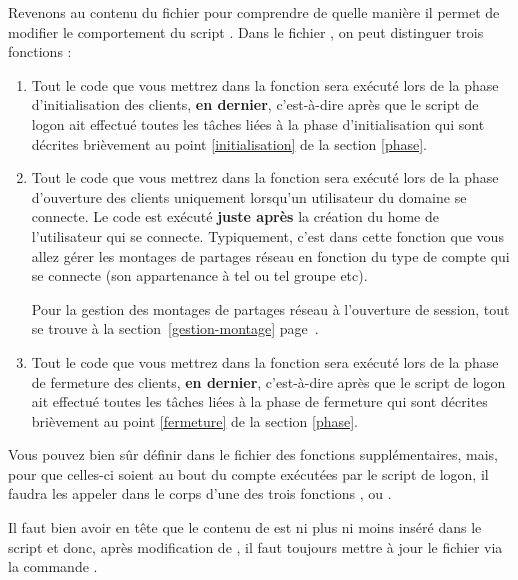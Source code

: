 Revenons au contenu du fichier  pour comprendre
de quelle manière il permet de modifier le comportement du script
. Dans le fichier ,
on peut distinguer trois fonctions :


\begin{enumerate}
\item Tout le code que vous mettrez dans la fonction 
sera exécuté lors de la phase d'initialisation des clients, \textbf{en dernier}, c'est-à-dire
après que le script de logon ait effectué toutes les tâches
liées à la phase d'initialisation qui sont décrites
brièvement au point \ref{initialisation} de la section \ref{phase}.

\item Tout le code que vous mettrez dans la fonction 
sera exécuté lors de la phase d'ouverture des clients uniquement lorsqu'un
utilisateur du domaine se connecte. Le code est exécuté \textbf{juste après}
la création du \og home \fg{} de l'utilisateur qui se connecte. 
Typiquement, c'est dans cette fonction que vous allez gérer les montages
de partages réseau en fonction du type de compte qui se connecte (son
appartenance à tel ou tel groupe etc).

Pour la gestion des montages de partages réseau à l'ouverture de session,
tout se trouve à la section~\ref{gestion-montage} page~\pageref{gestion-montage}.


\item Tout le code que vous mettrez dans la fonction 
sera exécuté lors de la phase de fermeture des clients, \textbf{en dernier}, c'est-à-dire
après que le script de logon ait effectué toutes les tâches
liées à la phase de fermeture qui sont décrites
brièvement au point \ref{fermeture} de la section \ref{phase}.

\end{enumerate}

Vous pouvez bien sûr définir dans le fichier 
des fonctions supplémentaires, mais, pour que celles-ci soient
au bout du compte exécutées
par le script de logon, il
faudra les appeler dans le corps d'une des trois
fonctions , 
ou .

Il faut bien avoir en tête que le contenu de 
est ni plus ni moins inséré dans le script  et donc, après
modification de , il faut toujours mettre à jour
le fichier  via la commande 
\og {} \fg{}.



